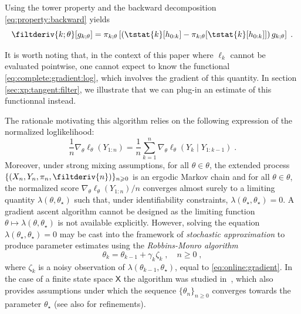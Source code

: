 \documentclass{article}
\newcommand{\md}[1]{g_{#1}}
\newcommand{\logllh}[1]{\ell_{#1}}
\newcommand{\pred}[1]{\pi_{#1}}
\newcommand{\parvec}{\theta}
\newcommand{\af}[1]{h_{#1}}
\newcommand{\deriv}{\nabla_{\parvec}}
\newcommand{\set}[1]{\mathsf{#1}}
\newcommand{\eqsp}{\;}
\newcommand{\qg}[1]{\ell_{#1}}
\begin{document}
Using the tower property  and the backward decomposition \eqref{eq:property:backward} yields
\begin{equation} 
\label{eq:tangent:identity}
\filtderiv{k;\parvec}[\md{k;\parvec}] = \pred{k;\parvec}\left[\left(\tstat{k} [\af{0:k}] - \pred{k;\parvec}[\tstat{k}[\af{0:k}]]\right) \md{k;\parvec}\right]\eqsp.
\end{equation}

It is worth noting that, in the context of this paper where $\qg{k}$ cannot be evaluated pointwise, one cannot expect to know the functional \eqref{eq:complete:gradient:log}, which involves the gradient of this quantity. 
In section \ref{sec:xp:tangent:filter}, we illustrate that we can plug-in an estimate of this functionnal instead. 

The rationale motivating this algorithm relies on the following expression of the normalized loglikelihood:
$$
\frac{1}{n} \deriv \logllh{\parvec}(Y_{1:n}) = \frac{1}{n} \sum_{k = 1}^n \deriv \logllh{\parvec}\left(Y_k \mid Y_{1:k - 1}\right)\eqsp.$$
Moreover, under strong mixing assumptions, for all  $\parvec \in \parvec$, the extended process $\{ (X_n, Y_n, \pred{n}, \filtderiv{n}) \}_{n \geqslant 0}$ is an ergodic Markov chain and for all $\parvec \in \parvec$, the normalized score $\deriv \logllh{\parvec}(Y_{1:n})/n$  converges almost surely to a limiting quantity $\lambda(\parvec, \parvec_{\star})$ such that, under identifiability constraints, $\lambda(\parvec_{\star}, \parvec_{\star}) = 0$. 
A gradient ascent algorithm cannot be designed as the limiting function $\parvec \mapsto \lambda(\parvec, \parvec_{\star})$ is not available explicitly. 
However, solving the equation $\lambda(\parvec_{\star}, \parvec_{\star}) = 0$ may be cast into the framework of \emph{stochastic approximation} to produce parameter estimates using the \emph{Robbins-Monro algorithm}
\begin{equation}
\label{eq:par:update}
\parvec_{k} = \parvec_{k - 1} + \gamma_{k} \zeta_{k}\eqsp, \quad n\geqslant 0\eqsp, 
\end{equation}
where $\zeta_{k}$ is a noisy observation of $\lambda(\parvec_{k - 1}, \parvec_{\star})$, equal to \eqref{eq:online:gradient}.  
In the case of a finite state space $\set{X}$ the algorithm was studied in~\cite{legland1997recursive}, which also provides assumptions under which the sequence $\{\parvec_{n}\}_{n\geqslant 0}$ converges towards the parameter $\parvec_{\star}$ (see also \cite{tadic2010analyticity} for refinements). 
\end{document}
